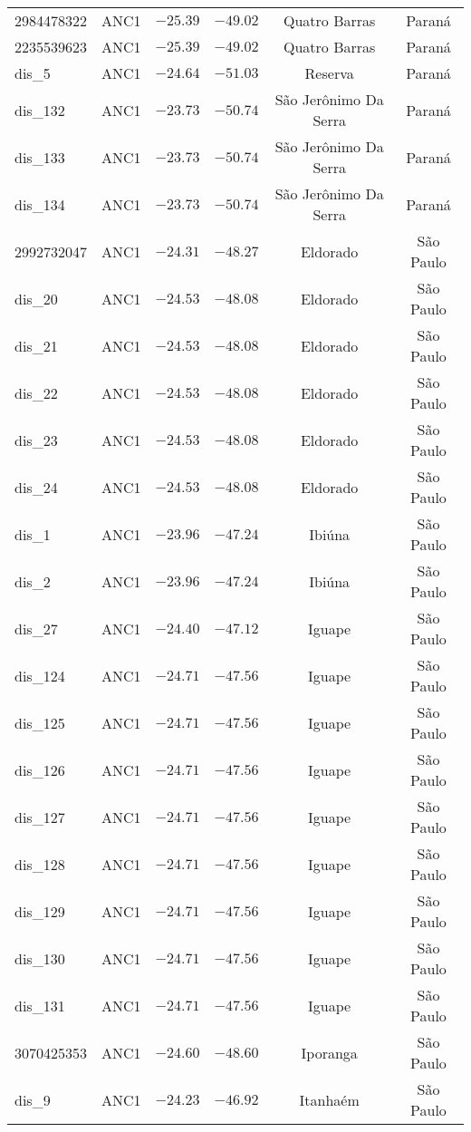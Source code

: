 \begin{longtable}{lccccc}
2984478322 & ANC1 & $-25.39$ & $-49.02$ & Quatro Barras & Paraná \\ 
2235539623 & ANC1 & $-25.39$ & $-49.02$ & Quatro Barras & Paraná \\ 
dis\_5 & ANC1 & $-24.64$ & $-51.03$ & Reserva & Paraná \\ 
dis\_132 & ANC1 & $-23.73$ & $-50.74$ & São Jerônimo Da Serra & Paraná \\ 
dis\_133 & ANC1 & $-23.73$ & $-50.74$ & São Jerônimo Da Serra & Paraná \\ 
dis\_134 & ANC1 & $-23.73$ & $-50.74$ & São Jerônimo Da Serra & Paraná \\ 
2992732047 & ANC1 & $-24.31$ & $-48.27$ & Eldorado & São Paulo \\ 
dis\_20 & ANC1 & $-24.53$ & $-48.08$ & Eldorado & São Paulo \\ 
dis\_21 & ANC1 & $-24.53$ & $-48.08$ & Eldorado & São Paulo \\ 
dis\_22 & ANC1 & $-24.53$ & $-48.08$ & Eldorado & São Paulo \\ 
dis\_23 & ANC1 & $-24.53$ & $-48.08$ & Eldorado & São Paulo \\ 
dis\_24 & ANC1 & $-24.53$ & $-48.08$ & Eldorado & São Paulo \\ 
dis\_1 & ANC1 & $-23.96$ & $-47.24$ & Ibiúna & São Paulo \\ 
dis\_2 & ANC1 & $-23.96$ & $-47.24$ & Ibiúna & São Paulo \\ 
dis\_27 & ANC1 & $-24.40$ & $-47.12$ & Iguape & São Paulo \\ 
dis\_124 & ANC1 & $-24.71$ & $-47.56$ & Iguape & São Paulo \\ 
dis\_125 & ANC1 & $-24.71$ & $-47.56$ & Iguape & São Paulo \\ 
dis\_126 & ANC1 & $-24.71$ & $-47.56$ & Iguape & São Paulo \\ 
dis\_127 & ANC1 & $-24.71$ & $-47.56$ & Iguape & São Paulo \\ 
dis\_128 & ANC1 & $-24.71$ & $-47.56$ & Iguape & São Paulo \\ 
dis\_129 & ANC1 & $-24.71$ & $-47.56$ & Iguape & São Paulo \\ 
dis\_130 & ANC1 & $-24.71$ & $-47.56$ & Iguape & São Paulo \\ 
dis\_131 & ANC1 & $-24.71$ & $-47.56$ & Iguape & São Paulo \\ 
3070425353 & ANC1 & $-24.60$ & $-48.60$ & Iporanga & São Paulo \\ 
dis\_9 & ANC1 & $-24.23$ & $-46.92$ & Itanhaém & São Paulo \\ 

\end{longtable}
